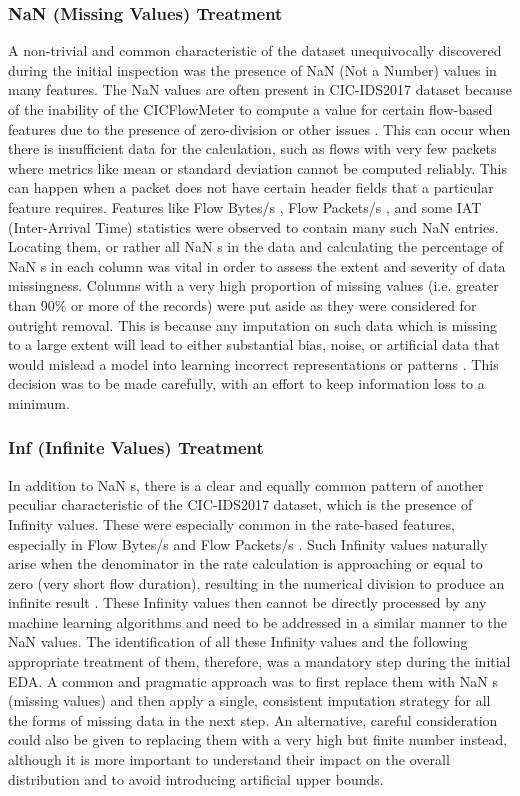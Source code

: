 \subsubsection{NaN (Missing Values) Treatment} 
A non-trivial and common characteristic of the dataset unequivocally discovered during the initial inspection was the presence of NaN (Not a Number) values in many features. The NaN values are often present in CIC-IDS2017 dataset because of the inability of the CICFlowMeter to compute a value for certain flow-based features due to the presence of zero-division or other issues \parencite{al2022cicids}. This can occur when there is insufficient data for the calculation, such as flows with very few packets where metrics like mean or standard deviation cannot be computed reliably. This can happen when a packet does not have certain header fields that a particular feature requires. Features like Flow Bytes/s , Flow Packets/s , and some IAT (Inter-Arrival Time) statistics were observed to contain many such NaN entries. Locating them, or rather all NaN s in the data and calculating the percentage of NaN s in each column was vital in order to assess the extent and severity of data missingness. Columns with a very high proportion of missing values (i.e. greater than 90\% or more of the records) were put aside as they were considered for outright removal. This is because any imputation on such data which is missing to a large extent will lead to either substantial bias, noise, or artificial data that would mislead a model into learning incorrect representations or patterns \parencite{mahfouz2022systematic}. This decision was to be made carefully, with an effort to keep information loss to a minimum.

\subsubsection{Inf (Infinite Values) Treatment} 
In addition to NaN s, there is a clear and equally common pattern of another peculiar characteristic of the CIC-IDS2017 dataset, which is the presence of Infinity values. These were especially common in the rate-based features, especially in Flow Bytes/s and Flow Packets/s . Such Infinity values naturally arise when the denominator in the rate calculation is approaching or equal to zero (very short flow duration), resulting in the numerical division to produce an infinite result \parencite{sharafaldin2018toward}. These Infinity values then cannot be directly processed by any machine learning algorithms and need to be addressed in a similar manner to the NaN values. The identification of all these Infinity values and the following appropriate treatment of them, therefore, was a mandatory step during the initial EDA. A common and pragmatic approach was to first replace them with NaN s (missing values) and then apply a single, consistent imputation strategy for all the forms of missing data in the next step. An alternative, careful consideration could also be given to replacing them with a very high but finite number instead, although it is more important to understand their impact on the overall distribution and to avoid introducing artificial upper bounds.


